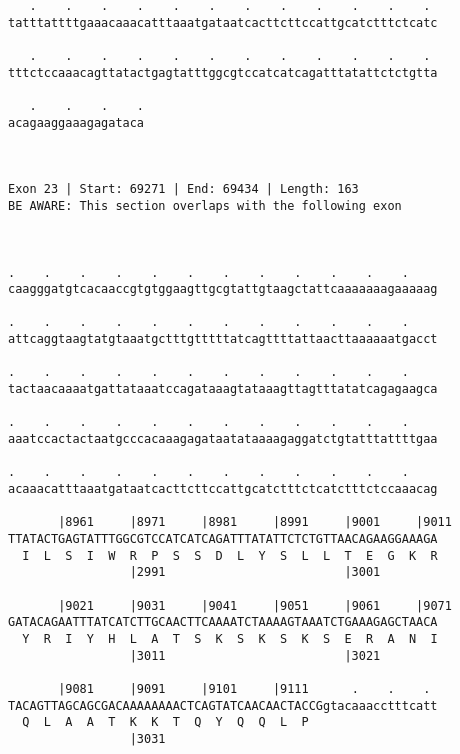 \documentclass{article}
\begin{document}
\begin{Verbatim}
   .    .    .    .    .    .    .    .    .    .    .    . 
tatttattttgaaacaaacatttaaatgataatcacttcttccattgcatctttctcatc
                                                            
   .    .    .    .    .    .    .    .    .    .    .    . 
tttctccaaacagttatactgagtatttggcgtccatcatcagatttatattctctgtta
                                                            
   .    .    .    .
acagaaggaaagagataca
                   
                   
 
Exon 23 | Start: 69271 | End: 69434 | Length: 163
BE AWARE: This section overlaps with the following exon



.    .    .    .    .    .    .    .    .    .    .    .    
caagggatgtcacaaccgtgtggaagttgcgtattgtaagctattcaaaaaaagaaaaag
                                                            
.    .    .    .    .    .    .    .    .    .    .    .    
attcaggtaagtatgtaaatgctttgtttttatcagttttattaacttaaaaaatgacct
                                                            
.    .    .    .    .    .    .    .    .    .    .    .    
tactaacaaaatgattataaatccagataaagtataaagttagtttatatcagagaagca
                                                            
.    .    .    .    .    .    .    .    .    .    .    .    
aaatccactactaatgcccacaaagagataatataaaagaggatctgtatttattttgaa
                                                            
.    .    .    .    .    .    .    .    .    .    .    .    
acaaacatttaaatgataatcacttcttccattgcatctttctcatctttctccaaacag
                                                            
       |8961     |8971     |8981     |8991     |9001     |9011
TTATACTGAGTATTTGGCGTCCATCATCAGATTTATATTCTCTGTTAACAGAAGGAAAGA
  I  L  S  I  W  R  P  S  S  D  L  Y  S  L  L  T  E  G  K  R
                 |2991                         |3001        
  
       |9021     |9031     |9041     |9051     |9061     |9071
GATACAGAATTTATCATCTTGCAACTTCAAAATCTAAAAGTAAATCTGAAAGAGCTAACA
  Y  R  I  Y  H  L  A  T  S  K  S  K  S  K  S  E  R  A  N  I
                 |3011                         |3021        
  
       |9081     |9091     |9101     |9111      .    .    . 
TACAGTTAGCAGCGACAAAAAAAACTCAGTATCAACAACTACCGgtacaaacctttcatt
  Q  L  A  A  T  K  K  T  Q  Y  Q  Q  L  P                  
                 |3031                                      
  

\end{Verbatim}
\end{document}
